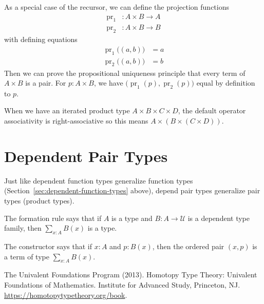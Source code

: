 \documentclass[11pt]{article}
\newcommand{\universe}{\mathcal{U}}
\DeclareMathOperator{\projection}{pr}
\begin{document}
As a special case of the recursor, we can define the projection functions
\begin{align*}
   \projection_1 & : A \times B \to A
   \\ 
   \projection_2 & : A \times B \to B
\end{align*}
with defining equations
\begin{align*}
   \projection_1\bigl((a, b)\bigr) & = a
   \\
   \projection_2\bigl((a, b)\bigr) & = b
\end{align*}
Then we can prove the propositional uniqueness principle that every term
of $A \times B$ is a pair.  For $p : A \times B$,
we have $\bigr(\projection_1(p), \projection_2(p)\bigr)$ equal by definition
to $p$.

When we have an iterated product type $A \times B \times C \times D$,
the default operator associativity is right-associative so this means
$A \times (B \times (C \times D))$.

\section{Dependent Pair Types}

Just like dependent function types generalize function types
(Section~\ref{sec:dependent-function-types} above), depend pair types
generalize pair types (product types).

The formation rule says that if $A$ is a type and $B : A \to \universe$
is a dependent type family, then $\sum_{x : A} B(x)$ is a type.

The constructor says that if $x : A$ and $p : B(x)$, then the ordered
pair $(x, p)$ is a term of type $\sum_{x : A} B(x)$.

\begin{thebibliography}{}

The Univalent Foundations Program (2013).
\newblock Homotopy Type Theory: Univalent Foundations of Mathematics.
\newblock Institute for Advanced Study, Princeton, NJ.
\newblock \url{https://homotopytypetheory.org/book}.

\end{thebibliography}
\end{document}
